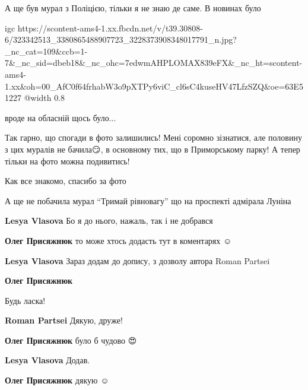 
А ще був мурал з Поліцією, тільки я не знаю де саме. В новинах було

\ifcmt
  igc https://scontent-ams4-1.xx.fbcdn.net/v/t39.30808-6/323342513_3380865488907723_3228373908348017791_n.jpg?_nc_cat=109&ccb=1-7&_nc_sid=dbeb18&_nc_ohc=7edwmAHPLOMAX839eFX&_nc_ht=scontent-ams4-1.xx&oh=00_AfC0f64frhabW3o9pXTPy6viC_cl6sC4kuseHV47LfzSZQ&oe=63E51227
  @width 0.8
\fi

\begin{itemize} %
вроде на обласній щось було...
\end{itemize} %


Так гарно, що спогади в фото залишились! Мені соромно зізнатися, але половину з
цих муралів не бачила😏, в основному тих, що в Приморському парку! А тепер тільки
на фото можна подивитись!


Как все знакомо, спасибо за фото 💛💙


А ще не побачила мурал \enquote{Тримай рівновагу} що на проспекті адмірала Луніна

\begin{itemize} %
\textbf{Lesya Vlasova} Бо я до нього, нажаль, так і не добрався

\textbf{Олег Присяжнюк} то може хтось додасть тут в коментарях ☺️

\textbf{Lesya Vlasova} Зараз додам до допису, з дозволу автора Roman Partsei

\textbf{Олег Присяжнюк}

Будь ласка!

\textbf{Roman Partsei} Дякую, друже!

\textbf{Олег Присяжнюк} було б чудово 😍

\textbf{Lesya Vlasova} Додав.

\textbf{Олег Присяжнюк} дякую ☺️
\end{itemize} %

